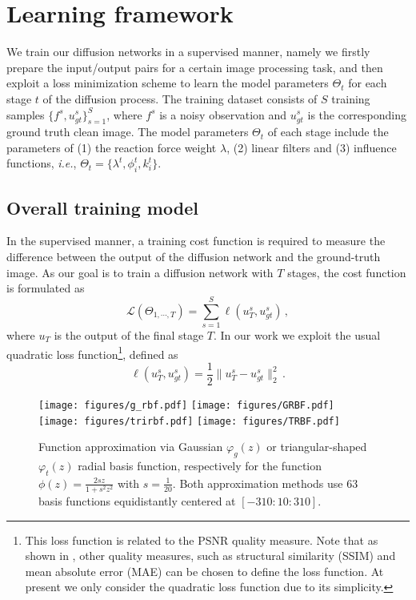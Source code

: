 \documentclass[10pt,journal,compsoc]{IEEEtran}
\newcommand{\cL}{\mathcal{L}}
\newcommand{\suml}[2]{\sum\limits_{#1}^{#2}}
\newcommand{\ie}{\emph{i.e.}}
\begin{document}
\section{Learning framework}
We train our diffusion networks in a supervised manner, namely we firstly prepare the input/output pairs 
for a certain image processing task, and then 
exploit a loss minimization scheme to learn the model parameters $\Theta_t$ for each 
stage $t$ of the diffusion process. The training dataset consists of 
$S$ training samples $\{f^s,u_{gt}^s\}_{s=1}^S$, where 
$f^s$ is a noisy observation and $u_{gt}^s$ is the corresponding ground truth clean image. 
The model parameters $\Theta_t$ of each stage include the parameters of (1) the reaction force weight $\lambda$, 
(2) linear filters and (3) influence functions, \ie, $\Theta_t = \{\lambda^t, \phi_i^t, k_i^t\}$. 

\subsection{Overall training model}
In the supervised manner, a training cost function is required 
to measure the difference between the output of the diffusion 
network and the ground-truth image. As our goal is to train a diffusion network with $T$ stages, the cost function is formulated as 
\begin{equation}\label{joint}
\cL(\Theta_{1, \cdots, T} ) = \suml{s = 1}{S}\ell(u_T^s, u_{gt}^s) \,,
\end{equation}
where $u_T$ is the output of the final stage $T$. In our work we exploit 
the usual quadratic loss function\footnote{
This loss function is related to the PSNR quality measure. Note that as shown in \cite{ECCV2012RTF}, other 
quality measures, such as structural similarity (SSIM) and mean absolute error (MAE) can be chosen to define the loss function.
At present we only consider the quadratic loss function due to its simplicity.}, 
defined as
\begin{equation}\label{loss}
\ell(u_T^s, u_{gt}^s) = \frac 1 2 \|u_T^s - u_{gt}^s\|^2_2 \,.
\end{equation}

\begin{figure*}[t!]
\centering
\texttt{[image: figures/g\_rbf.pdf]}
\texttt{[image: figures/GRBF.pdf]}
\texttt{[image: figures/trirbf.pdf]}
\texttt{[image: figures/TRBF.pdf]}
\caption{Function approximation via Gaussian $\varphi_g(z)$ or 
triangular-shaped $\varphi_t(z)$ radial basis function, respectively for the function $\phi(z) = \frac{2sz}{1+s^2z^2}$ with $s = 
\frac {1}{20}$. Both approximation methods use 63 basis functions equidistantly centered at $[-310:10:310]$.}\label{mapping}
\vspace{-0.4cm}
\end{figure*}
\end{document}
